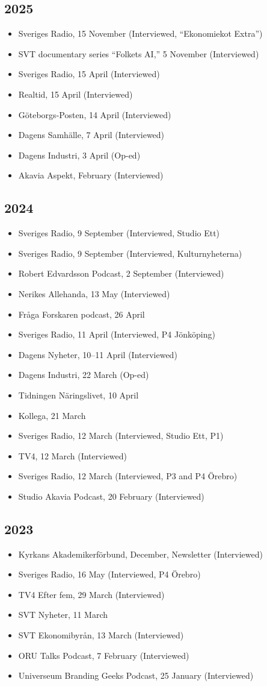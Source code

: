 \documentclass[11pt,a4paper]{article}
\newcommand{\cventry}[1]{\item #1}
\begin{document}
\subsection{2025}
\begin{itemize}
  \cventry{Sveriges Radio, 15 November (Interviewed, ``Ekonomiekot Extra'')}
  \cventry{SVT documentary series ``Folkets AI,'' 5 November (Interviewed)}
  \cventry{Sveriges Radio, 15 April (Interviewed)}
  \cventry{Realtid, 15 April (Interviewed)}
  \cventry{Göteborgs-Posten, 14 April (Interviewed)}
  \cventry{Dagens Samhälle, 7 April (Interviewed)}
  \cventry{Dagens Industri, 3 April (Op-ed)}
  \cventry{Akavia Aspekt, February (Interviewed)}
\end{itemize}

\subsection{2024}
\begin{itemize}
  \cventry{Sveriges Radio, 9 September (Interviewed, Studio Ett)}
  \cventry{Sveriges Radio, 9 September (Interviewed, Kulturnyheterna)}
  \cventry{Robert Edvardsson Podcast, 2 September (Interviewed)}
  \cventry{Nerikes Allehanda, 13 May (Interviewed)}
  \cventry{Fråga Forskaren podcast, 26 April}
  \cventry{Sveriges Radio, 11 April (Interviewed, P4 Jönköping)}
  \cventry{Dagens Nyheter, 10--11 April (Interviewed)}
  \cventry{Dagens Industri, 22 March (Op-ed)}
  \cventry{Tidningen Näringslivet, 10 April}
  \cventry{Kollega, 21 March}
  \cventry{Sveriges Radio, 12 March (Interviewed, Studio Ett, P1)}
  \cventry{TV4, 12 March (Interviewed)}
  \cventry{Sveriges Radio, 12 March (Interviewed, P3 and P4 Örebro)}
  \cventry{Studio Akavia Podcast, 20 February (Interviewed)}
\end{itemize}

\subsection{2023}
\begin{itemize}
  \cventry{Kyrkans Akademikerförbund, December, Newsletter (Interviewed)}
  \cventry{Sveriges Radio, 16 May (Interviewed, P4 Örebro)}
  \cventry{TV4 Efter fem, 29 March (Interviewed)}
  \cventry{SVT Nyheter, 11 March}
  \cventry{SVT Ekonomibyrån, 13 March (Interviewed)}
  \cventry{ORU Talks Podcast, 7 February (Interviewed)}
  \cventry{Universeum Branding Geeks Podcast, 25 January (Interviewed)}
\end{itemize}
\end{document}
